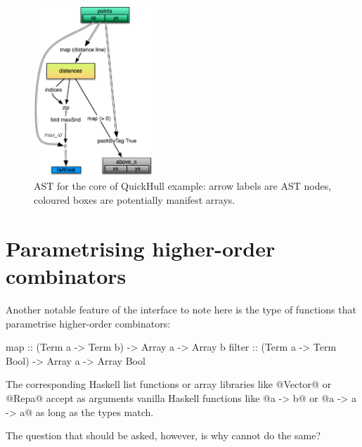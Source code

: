 \documentclass[preamble.tex]{subfiles}
\begin{document}
\begin{figure}
\includegraphics[width=0.4\textwidth,center]{img/QuickHull-flat-but-true}
\caption{\label{fig:QuickHull-flat}{AST for the core of QuickHull example: arrow labels are AST nodes, coloured boxes are potentially manifest arrays.}}
\end{figure}




\section{Parametrising higher-order combinators}
\label{sec:Scalar-language}
\iscalarlang

Another notable feature of the interface to note here is the type of functions that parametrise higher-order combinators:

\begin{hscode}
map    :: (Term a -> Term b) -> Array a -> Array b
filter :: (Term a -> Term Bool) -> Array a -> Array Bool
\end{hscode}

The corresponding Haskell list functions or array libraries like @Vector@ or @Repa@ \cite{KCL+10} accept as arguments vanilla Haskell functions like @a -> b@ or @a -> a -> a@ as long as the types match.

The question that should be asked, however, is why cannot \LiveFusion do the same?
\end{document}
